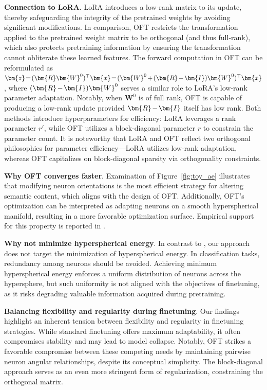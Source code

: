 \textbf{Connection to LoRA}. LoRA introduces a low-rank matrix to its update, thereby safeguarding the integrity of the pretrained weights by avoiding significant modifications. In comparison, OFT restricts the transformation applied to the pretrained weight matrix to be orthogonal (and thus full-rank), which also protects pretraining information by ensuring the transformation cannot obliterate these learned features. The forward computation in OFT can be reformulated as $\thickmuskip=2mu \medmuskip=2mu \bm{z}=(\bm{R}\bm{W}^0)^\top\bm{x}=(\bm{W}^0+(\bm{R}-\bm{I})\bm{W}^0)^\top\bm{x}$, where $\thickmuskip=2mu \medmuskip=2mu (\bm{R}-\bm{I})\bm{W}^0$ serves a similar role to LoRA's low-rank parameter adaptation. Notably, when $\bm{W}^0$ is of full rank, OFT is capable of producing a low-rank update provided $\thickmuskip=2mu \medmuskip=2mu \bm{R}-\bm{I}$ itself has low rank. Both methods introduce hyperparameters for efficiency: LoRA leverages a rank parameter $r'$, while OFT utilizes a block-diagonal parameter $r$ to constrain the parameter count. It is noteworthy that LoRA and OFT reflect two orthogonal philosophies for parameter efficiency—LoRA utilizes low-rank adaptation, whereas OFT capitalizes on block-diagonal sparsity via orthogonality constraints.

\textbf{Why OFT converges faster}. Examination of Figure~\ref{fig:toy_ae} illustrates that modifying neuron orientations is the most efficient strategy for altering semantic content, which aligns with the design of OFT. Additionally, OFT's optimization can be interpreted as adapting neurons on a smooth hyperspherical manifold, resulting in a more favorable optimization surface. Empirical support for this property is reported in \cite{liu2021orthogonal}.

\textbf{Why not minimize hyperspherical energy}. In contrast to \cite{liu2021orthogonal}, our approach does not target the minimization of hyperspherical energy. In classification tasks, redundancy among neurons should be avoided. Achieving minimum hyperspherical energy enforces a uniform distribution of neurons across the hypersphere, but such uniformity is not aligned with the objectives of finetuning, as it risks degrading valuable information acquired during pretraining.

\textbf{Balancing flexibility and regularity during finetuning}. Our findings highlight an inherent tension between flexibility and regularity in finetuning strategies. While standard finetuning offers maximum adaptability, it often compromises stability and may lead to model collapse. Notably, OFT strikes a favorable compromise between these competing needs by maintaining pairwise neuron angular relationships, despite its conceptual simplicity. The block-diagonal approach serves as an even more stringent form of regularization, constraining the orthogonal matrix.

